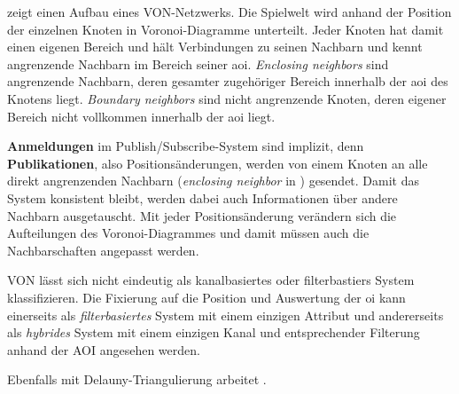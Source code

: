  zeigt einen Aufbau eines VON-Netzwerks. Die Spielwelt wird anhand der Position der einzelnen Knoten in Voronoi-Diagramme \cite{Aurenhammer1991Voronoi} unterteilt. Jeder Knoten hat damit einen eigenen Bereich und hält Verbindungen zu seinen Nachbarn und kennt angrenzende Nachbarn im Bereich seiner \ac{aoi}. \emph{Enclosing neighbors} sind angrenzende Nachbarn, deren gesamter zugehöriger Bereich innerhalb der \ac{aoi} des Knotens liegt. \emph{Boundary neighbors} sind nicht angrenzende Knoten, deren eigener Bereich nicht vollkommen innerhalb der \ac{aoi} liegt.

\textbf{Anmeldungen} im Publish/Subscribe-System sind implizit, denn \textbf{Publikationen}, also Positionsänderungen, werden von einem Knoten an alle direkt angrenzenden Nachbarn (\emph{enclosing neighbor} in ) gesendet. Damit das System konsistent bleibt, werden dabei auch Informationen über andere Nachbarn ausgetauscht. Mit jeder Positionsänderung verändern sich die Aufteilungen des Voronoi-Diagrammes und damit müssen auch die Nachbarschaften angepasst werden.

VON lässt sich nicht eindeutig als kanalbasiertes oder filterbastiers System klassifizieren. Die Fixierung auf die Position und Auswertung der \ac{oi} kann einerseits als \emph{filterbasiertes} System mit einem einzigen Attribut und andererseits als \emph{hybrides} System mit einem einzigen Kanal und entsprechender Filterung anhand der AOI angesehen werden.

Ebenfalls mit Delauny-Triangulierung arbeitet \cite{Liebeherr2002Applicationlayer}.
